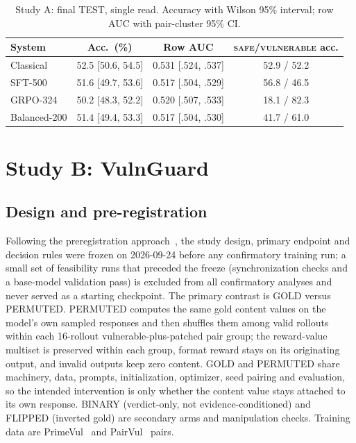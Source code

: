 \documentclass[journal]{IEEEtran}
\newcommand{\vuln}{\textsc{vulnerable}}
\newcommand{\safe}{\textsc{safe}}
\begin{document}
\begin{table}[t]
\centering\scriptsize\setlength{\tabcolsep}{2.5pt}
\caption{Study A: final TEST, single read. Accuracy with Wilson 95\% interval; row AUC with pair-cluster 95\% CI.}
\label{tab:test}
\begin{tabular}{lccc}
\toprule
System & Acc.\ (\%) & Row AUC & \safe{}/\vuln{} acc.\\
\midrule
Classical & 52.5 [50.6, 54.5] & 0.531 [.524, .537] & 52.9 / 52.2\\
SFT-500 & 51.6 [49.7, 53.6] & 0.517 [.504, .529] & 56.8 / 46.5\\
GRPO-324 & 50.2 [48.3, 52.2] & 0.520 [.507, .533] & 18.1 / 82.3\\
Balanced-200 & 51.4 [49.4, 53.3] & 0.517 [.504, .530] & 41.7 / 61.0\\
\bottomrule
\end{tabular}
\end{table}

\section{Study B: VulnGuard}
\label{sec:programB}
\subsection{Design and pre-registration}
Following the preregistration approach~\cite{nosek}, the study design, primary endpoint and decision rules were frozen on 2026-09-24 before any confirmatory training run; a small set of feasibility runs that preceded the freeze (synchronization checks and a base-model validation pass) is excluded from all confirmatory analyses and never served as a starting checkpoint. The primary contrast is GOLD versus PERMUTED. PERMUTED computes the same gold content values on the model's own sampled responses and then shuffles them among valid rollouts within each 16-rollout vulnerable-plus-patched pair group; the reward-value multiset is preserved within each group, format reward stays on its originating output, and invalid outputs keep zero content. GOLD and PERMUTED share machinery, data, prompts, initialization, optimizer, seed pairing and evaluation, so the intended intervention is only whether the content value stays attached to its own response. BINARY (verdict-only, not evidence-conditioned) and FLIPPED (inverted gold) are secondary arms and manipulation checks. Training data are PrimeVul~\cite{primevul} and PairVul~\cite{vulrag} pairs.
\end{document}
